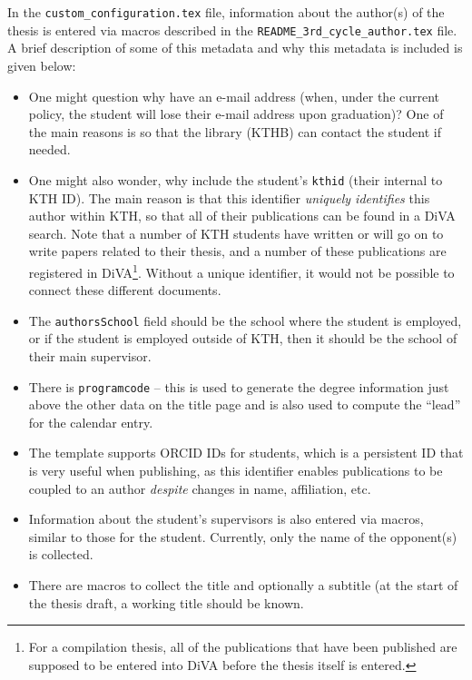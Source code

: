 \documentclass[12pt, twoside]{article}
\newcommand{\fname}[1]{\texttt{#1}}
\begin{document}
In the  \fname{custom\_configuration.tex} file, information about the author(s) of the thesis is entered via macros described in the \fname{README\_3rd\_cycle\_author.tex} file. A brief description of some of this metadata and why this metadata is included is given below:
\begin{itemize}
    \item One might question why have an e-mail address (when, under the current policy, the student will lose their e-mail address upon graduation)? One of the main reasons is so that the library (\ie \gls{KTHB}) can contact the student if needed.
    
    \item One might also wonder, why include the student’s \texttt{kthid} (\ie their internal to KTH ID). The main reason is that this identifier \textit{uniquely identifies} this author within KTH, so that all of their publications can be found in a DiVA search. Note that a number of KTH students have written or will go on to write papers related to their thesis, and a number of these publications are registered in DiVA\footnote{For a compilation thesis, all of the publications that have been published are supposed to be entered into DiVA before the thesis itself is entered.}. Without a unique identifier, it would not be possible to connect these different documents.
    
    \item The \texttt{authorsSchool} field should be the school where the student is employed, or if the student is employed outside of KTH, then it should be the school of their main supervisor.
    
    \item There is \texttt{programcode} – this is used to generate the degree information just above the other data on the title page and is also used to compute the “lead” for the calendar entry.

    \item The template supports ORCID IDs for students, which is a persistent ID that is very useful when publishing, as this identifier enables publications to be coupled to an author \textit{despite} changes in name, affiliation, etc.

    \item Information about the student's supervisors is also entered via macros, similar to those for the student. Currently, only the name of the opponent(s) is collected.

    \item There are macros to collect the title and optionally a subtitle (at the start of the thesis draft, a working title should be known.


\end{itemize}
\end{document}
